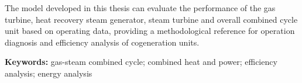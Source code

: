 The model developed in this thesis can evaluate the performance of the gas turbine, heat recovery steam generator, steam turbine and overall combined cycle unit based on operating data, providing a methodological reference for operation diagnosis and efficiency analysis of cogeneration units.

\vspace{1em}

\noindent\textbf{Keywords:} gas-steam combined cycle; combined heat and power; efficiency analysis; energy analysis

\endgroup

\newpage
